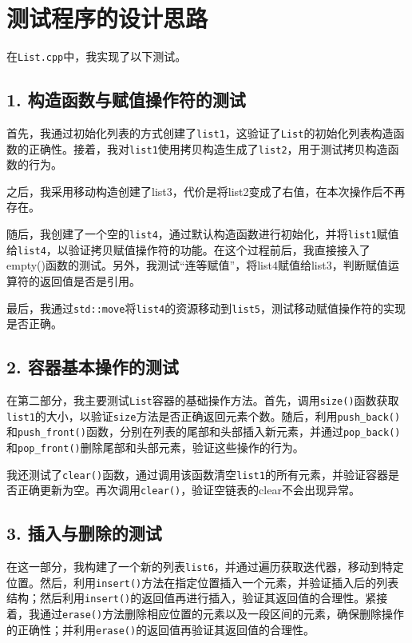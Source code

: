 \documentclass[UTF8]{ctexart}
\begin{document}
\pagestyle{fancy}
\fancyhead{}

\section{测试程序的设计思路}
在\texttt{List.cpp}中，我实现了以下测试。
\subsection*{1. 构造函数与赋值操作符的测试}
首先，我通过初始化列表的方式创建了\texttt{list1}，这验证了\texttt{List}的初始化列表构造函数的正确性。接着，我对\texttt{list1}使用拷贝构造生成了\texttt{list2}，用于测试拷贝构造函数的行为。

之后，我采用移动构造创建了list3，代价是将list2变成了右值，在本次操作后不再存在。

随后，我创建了一个空的\texttt{list4}，通过默认构造函数进行初始化，并将\texttt{list1}赋值给\texttt{list4}，以验证拷贝赋值操作符的功能。在这个过程前后，我直接接入了empty()函数的测试。另外，我测试“连等赋值”，将list4赋值给list3，判断赋值运算符的返回值是否是引用。

最后，我通过\texttt{std::move}将\texttt{list4}的资源移动到\texttt{list5}，测试移动赋值操作符的实现是否正确。

\subsection*{2. 容器基本操作的测试}
在第二部分，我主要测试\texttt{List}容器的基础操作方法。首先，调用\texttt{size()}函数获取\texttt{list1}的大小，以验证\texttt{size}方法是否正确返回元素个数。随后，利用\texttt{push\_back()}和\texttt{push\_front()}函数，分别在列表的尾部和头部插入新元素，并通过\texttt{pop\_back()}和\texttt{pop\_front()}删除尾部和头部元素，验证这些操作的行为。

我还测试了\texttt{clear()}函数，通过调用该函数清空\texttt{list1}的所有元素，并验证容器是否正确更新为空。再次调用\texttt{clear()}，验证空链表的clear不会出现异常。

\subsection*{3. 插入与删除的测试}
在这一部分，我构建了一个新的列表\texttt{list6}，并通过遍历获取迭代器，移动到特定位置。然后，利用\texttt{insert()}方法在指定位置插入一个元素，并验证插入后的列表结构；然后利用\texttt{insert()}的返回值再进行插入，验证其返回值的合理性。紧接着，我通过\texttt{erase()}方法删除相应位置的元素以及一段区间的元素，确保删除操作的正确性；并利用\texttt{erase()}的返回值再验证其返回值的合理性。
\end{document}
